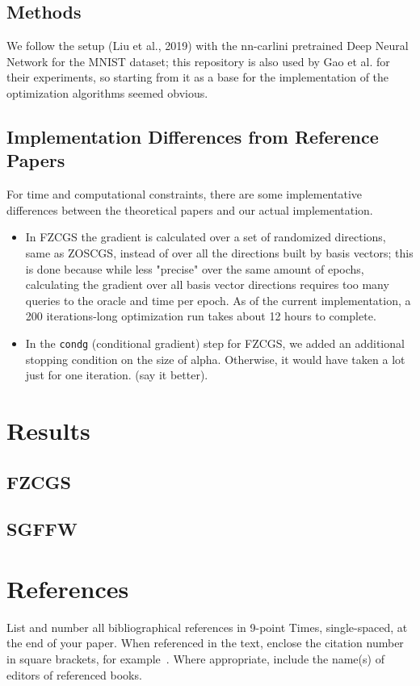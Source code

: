 \documentclass[10pt,twocolumn,letterpaper]{article}
\begin{document}
\subsection{Methods}

We follow the setup (Liu et al., 2019) with the nn-carlini pretrained Deep Neural Network for
the MNIST dataset; this repository is also used by Gao et al. for their experiments, so starting
from it as a base for the implementation of the optimization algorithms seemed obvious.

\subsection{Implementation Differences from Reference Papers}

For time and computational constraints, there are some implementative differences 
between the theoretical papers and our actual implementation.

\begin{itemize}
   \item In FZCGS the gradient is calculated over a set of 
   randomized directions, same as ZOSCGS, instead of over all 
   the directions built by basis vectors; this is done because 
   while less "precise" over the same amount of epochs, 
   calculating the gradient over all basis vector directions 
   requires too many queries to the oracle and time per epoch.
   As of the current implementation, a 200 iterations-long 
   optimization run takes about 12 hours to complete.

   \item In the \texttt{condg} (conditional gradient) step for FZCGS,
   we added an additional stopping condition on the size of alpha. Otherwise,
   it would have taken a lot just for one iteration. (say it better).
\end{itemize}


\section{Results}

\subsection{FZCGS}

\subsection{SGFFW}



\section{References}

List and number all bibliographical references in 9-point Times,
single-spaced, at the end of your paper. When referenced in the text,
enclose the citation number in square brackets, for
example~\cite{Authors14}.  Where appropriate, include the name(s) of
editors of referenced books.



{\small


}
\end{document}
